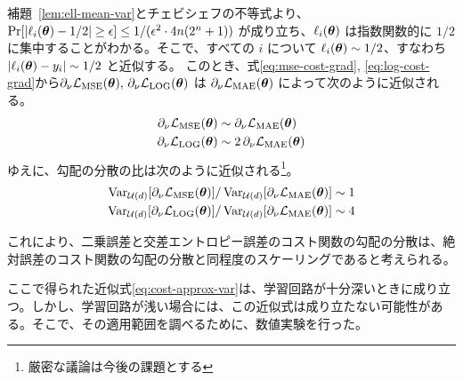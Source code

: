 補題~\ref{lem:ell-mean-var}とチェビシェフの不等式より、$\Pr[|\ell_i(\boldsymbol{\theta}) - 1/2| \geq \epsilon] \leq 1/(\epsilon^2\cdot 4n(2^n+1))$ が成り立ち、$\ell_i(\boldsymbol{\theta})$ は指数関数的に $1/2$ に集中することがわかる。そこで、すべての $i$ について $\ell_i(\boldsymbol{\theta}) \sim 1/2$、すなわち $|\ell_i(\boldsymbol{\theta}) - y_i| \sim 1/2$ と近似する。
このとき、式\eqref{eq:mse-cost-grad}, \eqref{eq:log-cost-grad}から$\partial_\nu\mathcal{L}_{\mathrm{MSE}}(\boldsymbol{\theta}),\,\partial_\nu\mathcal{L}_{\mathrm{LOG}}(\boldsymbol{\theta})$ は $\partial_\nu\mathcal{L}_{\mathrm{MAE}}(\boldsymbol{\theta})$ によって次のように近似される。
\begin{align}
    \begin{split}\label{eq:cost-approx}
        \partial_\nu\mathcal{L}_{\mathrm{MSE}}(\boldsymbol{\theta}) &\sim \partial_\nu\mathcal{L}_{\mathrm{MAE}}(\boldsymbol{\theta})\\
        \partial_\nu\mathcal{L}_{\mathrm{LOG}}(\boldsymbol{\theta}) &\sim 2\,\partial_\nu\mathcal{L}_{\mathrm{MAE}}(\boldsymbol{\theta})
    \end{split}
\end{align}
ゆえに、勾配の分散の比は次のように近似される\footnote{厳密な議論は今後の課題とする}。
\begin{align}
    \begin{split}\label{eq:cost-approx-var}
        \operatorname{Var}_{\mathcal{U}(d)}[\partial_\nu\mathcal{L}_{\mathrm{MSE}}(\boldsymbol{\theta})]/\operatorname{Var}_{\mathcal{U}(d)}[\partial_\nu\mathcal{L}_{\mathrm{MAE}}(\boldsymbol{\theta})] &\sim 1\\
        \operatorname{Var}_{\mathcal{U}(d)}[\partial_\nu\mathcal{L}_{\mathrm{LOG}}(\boldsymbol{\theta})]/\operatorname{Var}_{\mathcal{U}(d)}[\partial_\nu\mathcal{L}_{\mathrm{MAE}}(\boldsymbol{\theta})] &\sim 4
    \end{split}
\end{align}

これにより、二乗誤差と交差エントロピー誤差のコスト関数の勾配の分散は、絶対誤差のコスト関数の勾配の分散と同程度のスケーリングであると考えられる。

ここで得られた近似式\eqref{eq:cost-approx-var}は、学習回路が十分深いときに成り立つ。しかし、学習回路が浅い場合には、この近似式は成り立たない可能性がある。そこで、その適用範囲を調べるために、数値実験を行った。


